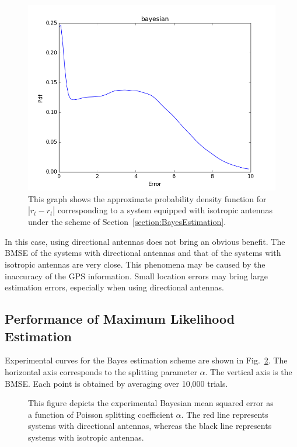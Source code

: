 \begin{figure}[]
	\centering
	\includegraphics[scale=0.5]{Figures/bayesomniex.png}
	\caption{This graph shows the approximate probability density function for $|r_{t}-\hat{r_{t}}|$ corresponding to a system equipped with isotropic antennas under the scheme of Section~\ref{section:BayesEstimation}. }
	\label{figure: bayesomniex}
\end{figure}
In this case, using directional antennas does not bring an obvious benefit.
The BMSE of the systems with directional antennas and that of the systems with isotropic antennas are very close.
This phenomena may be caused by the inaccuracy of the GPS information.
Small location errors may bring large estimation errors, especially when using directional antennas.


\subsection{Performance of Maximum Likelihood Estimation}

Experimental curves for the Bayes estimation scheme are shown in Fig.~\ref{figure: maxRTex}.
The horizontal axis corresponds to the splitting parameter $\alpha$.
The vertical axis is the BMSE.
Each point is obtained by averaging over 10,000 trials.
\begin{figure}[]
	\centerline{}
	\caption{This figure depicts the experimental Bayesian mean squared error as a function of Poisson splitting coefficient $\alpha$.
		The red line represents systems with directional antennas, whereas the black line represents systems with isotropic antennas.}
	\label{figure: maxRTex}
\end{figure}

